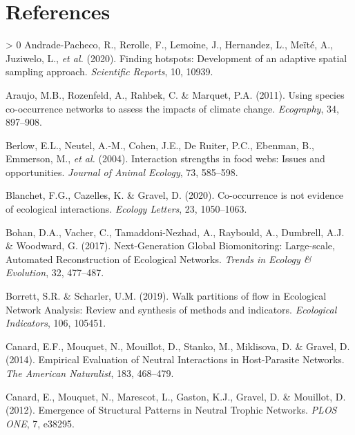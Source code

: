 \documentclass[10pt,oneside]{article}
\newlength{\cslhangindent}
\newenvironment{CSLReferences}[3] %
 {%
  \setlength{\parindent}{0pt}
  \ifodd #1 \everypar{\setlength{\hangindent}{\cslhangindent}}\ignorespaces\fi
  \ifnum #2 > 0
  \setlength{\parskip}{#2\baselineskip}
  \fi
 }%
 {}
\begin{document}
\hypertarget{references}{%
\section*{References}\label{references}}

\hypertarget{refs}{}
\begin{CSLReferences}{1}{0}
\leavevmode\hypertarget{ref-Andrade-Pacheco2020Finding}{}%
Andrade-Pacheco, R., Rerolle, F., Lemoine, J., Hernandez, L., Meïté, A.,
Juziwelo, L., \emph{et al.} (2020). Finding hotspots: Development of an
adaptive spatial sampling approach. \emph{Scientific Reports}, 10,
10939.

\leavevmode\hypertarget{ref-Araujo2011Usinga}{}%
Araujo, M.B., Rozenfeld, A., Rahbek, C. \& Marquet, P.A. (2011). Using
species co-occurrence networks to assess the impacts of climate change.
\emph{Ecography}, 34, 897--908.

\leavevmode\hypertarget{ref-Berlow2004Interaction}{}%
Berlow, E.L., Neutel, A.-M., Cohen, J.E., De Ruiter, P.C., Ebenman, B.,
Emmerson, M., \emph{et al.} (2004). Interaction strengths in food webs:
Issues and opportunities. \emph{Journal of Animal Ecology}, 73,
585--598.

\leavevmode\hypertarget{ref-Blanchet2020Cooccurrencea}{}%
Blanchet, F.G., Cazelles, K. \& Gravel, D. (2020). Co-occurrence is not
evidence of ecological interactions. \emph{Ecology Letters}, 23,
1050--1063.

\leavevmode\hypertarget{ref-Bohan2017NexGlo}{}%
Bohan, D.A., Vacher, C., Tamaddoni-Nezhad, A., Raybould, A., Dumbrell,
A.J. \& Woodward, G. (2017). Next-Generation Global Biomonitoring:
Large-scale, Automated Reconstruction of Ecological Networks.
\emph{Trends in Ecology \& Evolution}, 32, 477--487.

\leavevmode\hypertarget{ref-Borrett2019Walk}{}%
Borrett, S.R. \& Scharler, U.M. (2019). Walk partitions of flow in
Ecological Network Analysis: Review and synthesis of methods and
indicators. \emph{Ecological Indicators}, 106, 105451.

\leavevmode\hypertarget{ref-Canard2014Empiricala}{}%
Canard, E.F., Mouquet, N., Mouillot, D., Stanko, M., Miklisova, D. \&
Gravel, D. (2014). Empirical Evaluation of Neutral Interactions in
Host-Parasite Networks. \emph{The American Naturalist}, 183, 468--479.

\leavevmode\hypertarget{ref-Canard2012Emergencea}{}%
Canard, E., Mouquet, N., Marescot, L., Gaston, K.J., Gravel, D. \&
Mouillot, D. (2012). Emergence of Structural Patterns in Neutral Trophic
Networks. \emph{PLOS ONE}, 7, e38295.


\end{CSLReferences}
\end{document}
